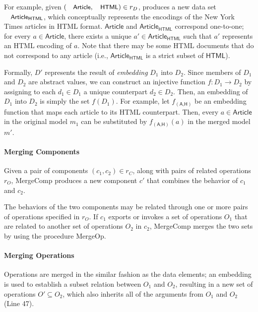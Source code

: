 For example, given $(\txtcname{Article}, \txtcname{HTML}) \in r_{D}$,  produces a new data set $\txtcname{Article}_{\textsf{HTML}}$, which conceptually represents the encodings of the New York Times articles in HTML format. $\textsf{Article}$ and $\textsf{Article}_{\textsf{HTML}}$ correspond one-to-one; for every $a \in \textsf{Article}$, there exists a unique $a' \in \textsf{Article}_{\textsf{HTML}}$ such that $a'$ represents an HTML encoding of $a$. Note that there may be some HTML documents that do not correspond to any article (i.e., $\textsf{Article}_{\textsf{HTML}}$ is a strict subset of $\textsf{HTML}$).

Formally, $D'$ represents the result of \textit{embedding} $D_{1}$ into
$D_{2}$. Since members of $D_{1}$ and $D_{2}$ are abstract values, we can
construct an injective function $f : D_{1} \rightarrow D_{2}$ by assigning
to each $d_{1} \in D_{1}$ a unique counterpart $d_{2} \in D_{2}$. Then, an
embedding of $D_{1}$ into $D_{2}$ is simply the set $f(D_{1})$. For example,
let $f_{(\textsf{A,H})}$ be an embedding function that maps each
article to its HTML counterpart. Then, every $a \in \textsf{Article}$
in the original model $m_{1}$ can be substituted by
$f_{(\textsf{A,H})}(a)$ in the merged model $m'$.


\paragraph{\textbf{Merging Components}} Given a pair of components
$(c_{1}, c_{2}) \in r_{C}$, along with pairs of related operations $r_{O}$,
\textsf{MergeComp} produces a new component $c'$ that combines the
behavior of $c_{1}$ and $c_{2}$.

The behaviors of the two components may be related through one or more
pairs of operations specified in $r_{O}$. If $c_{1}$ exports or invokes
a set of operations $O_{1}$ that are related to another set of operations
$O_{2}$ in $c_{2}$, \textsf{MergeComp} merges the two sets by using the
procedure \textsf{MergeOp}. 


\paragraph{\textbf{Merging Operations}} Operations are merged in the
similar fashion as the data elements; an embedding is used to
establish a subset relation between $O_{1}$ and $O_{2}$, resulting in a new
set of operations $O' \subseteq O_{2}$, which also inherits all of the
arguments from $O_{1}$ and $O_{2}$ (Line 47).

